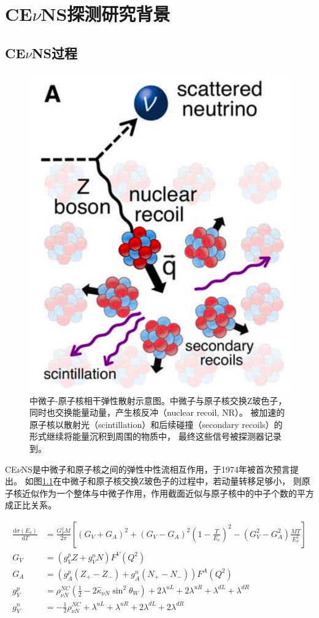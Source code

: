 
\chapter{CE$\nu$NS探测研究背景}

\section{CE$\nu$NS过程}

\begin{figure}
    \centering
    \includegraphics[width=0.4\linewidth]{figures/CEvNS_demo.png}
    \caption{\label{fig:cevns_demo} 中微子-原子核相干弹性散射示意图。中微子与原子核交换Z玻色子，同时也交换能量动量，产生核反冲（nuclear recoil, NR）。
    被加速的原子核以散射光（scintillation）和后续碰撞（secondary recoils）的形式继续将能量沉积到周围的物质中，
    最终这些信号被探测器记录到\cite{akimov_observation_2017}。}
\end{figure}

CE$\nu$NS是中微子和原子核之间的弹性中性流相互作用，于1974年被首次预言提出\cite{freedman_coherent_1974,kopeliovich_isotopic_1974}。
如图\ref{fig:cevns_demo}在中微子和原子核交换Z玻色子的过程中，若动量转移足够小，
则原子核近似作为一个整体与中微子作用，作用截面近似与原子核中的中子个数的平方成正比关系。

\begin{align}
    \label{eq:cevns}
    \frac{\mathrm{d}\sigma(E_\nu)}{\mathrm{d}T} &= \frac{G_F^2 M}{2\pi}\left[(G_V+G_A)^2+(G_V-G_A)^2(1-\frac{T}{E_{\nu}})^2-(G_V^2-G_A^2)\frac{MT}{E_{\nu}^2}\right] \\
    G_V &= (g_V^p Z+g_V^n N)F^V(Q^2) \\
    G_A &= (g_A^p(Z_{+}-Z_{-})+g_A^n(N_{+}-N_{-}))F^A(Q^2) \\
    g_V^p &= \rho_{\nu N}^{NC}(\frac{1}{2} - 2\hat{\kappa}_{\nu N}\sin^2\theta_W) + 2\lambda^{uL} + 2\lambda^{uR} + \lambda^{dL} + \lambda^{dR} \\
    g_V^n &= -\frac{1}{2}\rho_{\nu N}^{NC} + \lambda^{uL} + \lambda^{uR} + 2\lambda^{dL} + 2\lambda^{dR}
\end{align}

